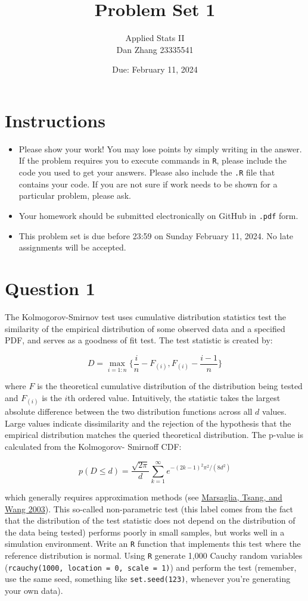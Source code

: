 \documentclass[12pt,letterpaper]{article}
\title{Problem Set 1}
\date{Due: February 11, 2024}
\author{Applied Stats II \\ Dan Zhang 23335541}
\begin{document}
	\maketitle
	\section*{Instructions}
	\begin{itemize}
	\item Please show your work! You may lose points by simply writing in the answer. If the problem requires you to execute commands in \texttt{R}, please include the code you used to get your answers. Please also include the \texttt{.R} file that contains your code. If you are not sure if work needs to be shown for a particular problem, please ask.
\item Your homework should be submitted electronically on GitHub in \texttt{.pdf} form.
\item This problem set is due before 23:59 on Sunday February 11, 2024. No late assignments will be accepted.
	\end{itemize}

	\vspace{.25cm}
\section*{Question 1} 
\vspace{.25cm}
\noindent The Kolmogorov-Smirnov test uses cumulative distribution statistics test the similarity of the empirical distribution of some observed data and a specified PDF, and serves as a goodness of fit test. The test statistic is created by:

$$D = \max_{i=1:n} \Big\{ \frac{i}{n}  - F_{(i)}, F_{(i)} - \frac{i-1}{n} \Big\}$$

\noindent where $F$ is the theoretical cumulative distribution of the distribution being tested and $F_{(i)}$ is the $i$th ordered value. Intuitively, the statistic takes the largest absolute difference between the two distribution functions across all $d$ values. Large values indicate dissimilarity and the rejection of the hypothesis that the empirical distribution matches the queried theoretical distribution. The p-value is calculated from the Kolmogorov-
Smirnoff CDF:

$$p(D \leq d)= \frac{\sqrt {2\pi}}{d} \sum _{k=1}^{\infty }e^{-(2k-1)^{2}\pi ^{2}/(8d^{2})}$$


\noindent which generally requires approximation methods (see \href{https://core.ac.uk/download/pdf/25787785.pdf}{Marsaglia, Tsang, and Wang 2003}). This so-called non-parametric test (this label comes from the fact that the distribution of the test statistic does not depend on the distribution of the data being tested) performs poorly in small samples, but works well in a simulation environment. Write an \texttt{R} function that implements this test where the reference distribution is normal. Using \texttt{R} generate 1,000 Cauchy random variables (\texttt{rcauchy(1000, location = 0, scale = 1)}) and perform the test (remember, use the same seed, something like \texttt{set.seed(123)}, whenever you're generating your own data).\\
	
\end{document}
